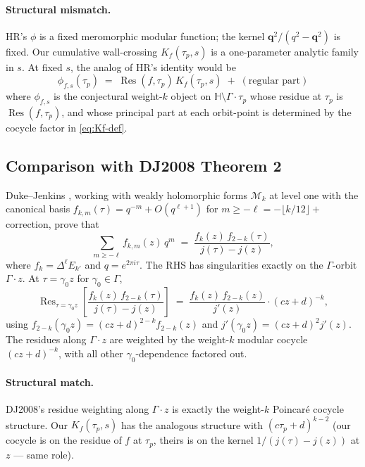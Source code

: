 \documentclass[11pt]{article}
\newcommand{\HH}{\mathbb{H}}
\DeclareMathOperator{\Res}{Res}
\begin{document}
\paragraph{Structural mismatch.}
HR's $\phi$ is a fixed meromorphic modular function; the kernel
$\mathbf{q}^2/(q^2 - \mathbf{q}^2)$ is fixed.  Our cumulative
wall-crossing $K_f(\tau_p, s)$ is a one-parameter analytic family in
$s$.  At fixed $s$, the analog of HR's identity would be
\begin{equation}\label{eq:HR-analog-conjecture}
  \phi_{f, s}(\tau_p) \;=\; \Res(f, \tau_p)\,K_f(\tau_p, s)
  \;+\; (\text{regular part})
\end{equation}
where $\phi_{f, s}$ is the conjectural weight-$k$ object on $\HH
\setminus \Gamma\cdot\tau_p$ whose residue at $\tau_p$ is $\Res(f,
\tau_p)$, and whose principal part at each orbit-point is determined
by the cocycle factor in \eqref{eq:Kf-def}.

\subsection{Comparison with DJ2008 Theorem 2}

Duke--Jenkins \cite[Thm.~2]{DJ2008}, working with weakly holomorphic
forms $\mathcal{M}_k$ at level one with the canonical basis
$f_{k, m}(\tau) = q^{-m} + O(q^{\ell + 1})$ for
$m \ge -\ell = -\lfloor k/12 \rfloor + $ correction, prove that
\begin{equation}\label{eq:DJ-genfunction}
  \sum_{m \ge -\ell}\!f_{k, m}(z)\,q^m
  \;=\; \frac{f_k(z)\,f_{2-k}(\tau)}{j(\tau) - j(z)},
\end{equation}
where $f_k = \Delta^\ell E_{k'}$ and $q = e^{2\pi i \tau}$.  The RHS
has singularities exactly on the $\Gamma$-orbit $\Gamma\cdot z$.  At
$\tau = \gamma_0 z$ for $\gamma_0 \in \Gamma$,
\begin{equation}\label{eq:DJ-residue}
  \Res_{\tau = \gamma_0 z}\!\left[\frac{f_k(z)\,f_{2-k}(\tau)}{j(\tau) - j(z)}\right]
  \;=\; \frac{f_k(z)\,f_{2-k}(z)}{j'(z)}\cdot(cz + d)^{-k},
\end{equation}
using $f_{2-k}(\gamma_0 z) = (cz + d)^{2-k}f_{2-k}(z)$ and
$j'(\gamma_0 z) = (cz + d)^2 j'(z)$.  The residues along $\Gamma\cdot
z$ are weighted by the weight-$k$ modular cocycle $(cz + d)^{-k}$,
with all other $\gamma_0$-dependence factored out.

\paragraph{Structural match.}
DJ2008's residue weighting along $\Gamma\cdot z$ is exactly the
weight-$k$ Poincar\'e cocycle structure.  Our $K_f(\tau_p, s)$ has
the analogous structure with $(c\tau_p + d)^{k - 2}$ (our cocycle is
on the residue of $f$ at $\tau_p$, theirs is on the kernel
$1/(j(\tau)-j(z))$ at $z$ — same role).
\end{document}
